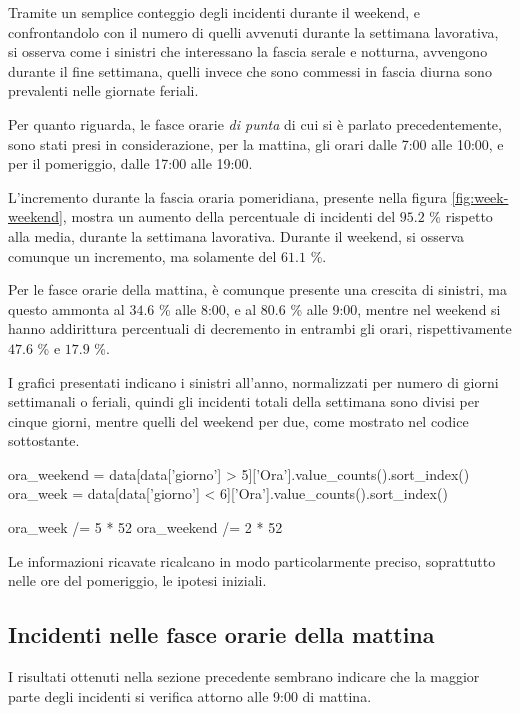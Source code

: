 \documentclass[a4paper]{report}
\newcommand{\quotestyle}[1]{\textit{#1}}
\begin{document}
Tramite un semplice conteggio degli incidenti durante il weekend, e 
confrontandolo con il numero di quelli avvenuti durante la 
settimana lavorativa, si osserva come i sinistri che interessano la fascia serale 
e notturna, avvengono durante il fine settimana, quelli invece che sono commessi 
in fascia diurna sono prevalenti nelle giornate feriali. 

Per quanto riguarda, le fasce orarie \quotestyle{di punta} di cui si 
è parlato precedentemente, 
sono stati presi in considerazione, per la mattina, gli orari dalle 7:00 alle 10:00, 
e per il pomeriggio, dalle 17:00 alle 19:00. 

L'incremento durante la fascia oraria pomeridiana, presente nella figura 
\ref{fig:week-weekend}, mostra un aumento della percentuale di incidenti 
del $95.2$ \% rispetto alla media, durante la settimana lavorativa. 
Durante il weekend, si osserva comunque un incremento, ma solamente del $61.1$ \%. 

Per le fasce orarie della mattina, è comunque presente una crescita di sinistri, 
ma questo ammonta al $34.6$ \% alle 8:00, e al $80.6$ \% alle 9:00, 
mentre nel weekend si hanno addirittura percentuali di decremento 
in entrambi gli orari, rispettivamente $47.6$ \% e $17.9$ \%. 

I grafici presentati indicano i sinistri all'anno, normalizzati per numero di 
giorni settimanali o feriali, quindi gli incidenti totali della settimana sono divisi 
per cinque giorni, mentre quelli del weekend per due, 
come mostrato nel codice sottostante. 

\begin{code}[language=Python]
ora_weekend = data[data['giorno'] > 5]['Ora'].value_counts().sort_index()
ora_week = data[data['giorno'] < 6]['Ora'].value_counts().sort_index()

ora_week /= 5 * 52
ora_weekend /= 2 * 52
\end{code}

Le informazioni ricavate ricalcano in modo particolarmente preciso, 
soprattutto nelle ore del pomeriggio, le ipotesi iniziali. 


\subsection{Incidenti nelle fasce orarie della mattina}

I risultati ottenuti nella sezione precedente sembrano indicare 
che la maggior parte degli incidenti si verifica attorno alle 9:00 di mattina. 
\end{document}
